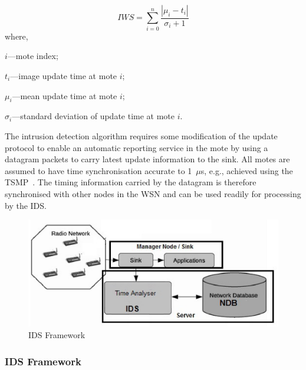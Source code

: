 \documentclass[conference,manuscript]{IEEEtran}
\begin{document}
\begin{equation}
\label{eqn2} 
	\mathit{IWS} = \sum \limits_{i=0}^{n} \frac{\left| \mu_i - t_i \right|}{\sigma_i + 1}
\end{equation}
where, 
\begin{inparaenum}
\item $\mathit{i}$---mote index;%
\item $\mathit{t_i}$---image update time at mote $\mathit{i}$;  
\item $\mathit{\mu_i}$---mean update time at mote $\mathit{i}$;  
\item $\mathit{\sigma_i}$---standard deviation of update time at mote $\mathit{i}$. 
\end{inparaenum}

The intrusion detection algorithm requires some modification of the update protocol to enable an automatic reporting service in the mote by using a datagram packets to carry latest update information to the sink.
All motes are assumed to have time synchronisation accurate to 1~$\mu$s, e.g., achieved using the TSMP~\cite{Pister08tsmp:time}.
The timing information carried by the datagram is therefore synchronised with other nodes in the WSN and can be used readily for processing by the IDS.

\begin{figure}[btp]
    \centering
    \includegraphics[width=\linewidth]{IDS_fw}	
    \caption{IDS Framework}
    \label{fig:ids_fw}
\end{figure}

\subsubsection*{IDS Framework}
\label{ssc:ids_fw}
\end{document}
